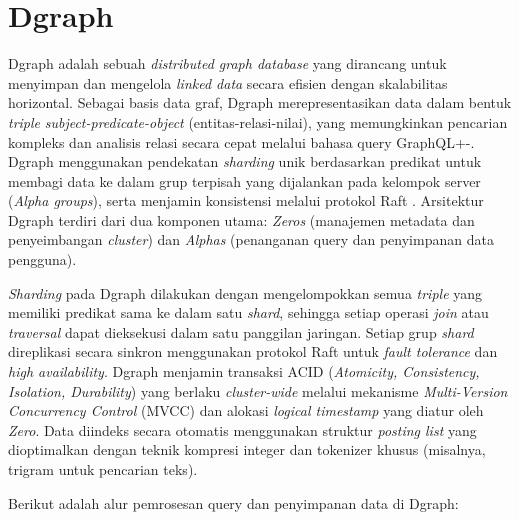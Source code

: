 \section{Dgraph}
\label{sec:dgraph}

Dgraph adalah sebuah \textit{distributed graph database} yang dirancang untuk menyimpan dan mengelola \textit{linked data} secara efisien dengan skalabilitas horizontal. Sebagai basis data graf, Dgraph merepresentasikan data dalam bentuk \textit{triple} \textit{subject-predicate-object} (entitas-relasi-nilai), yang memungkinkan pencarian kompleks dan analisis relasi secara cepat melalui bahasa query GraphQL+-. Dgraph menggunakan pendekatan \textit{sharding} unik berdasarkan predikat untuk membagi data ke dalam grup terpisah yang dijalankan pada kelompok server (\textit{Alpha groups}), serta menjamin konsistensi melalui protokol Raft \parencite{jain2005dgraph}. Arsitektur Dgraph terdiri dari dua komponen utama: \textit{Zeros} (manajemen metadata dan penyeimbangan \textit{cluster}) dan \textit{Alphas} (penanganan query dan penyimpanan data pengguna). 

\textit{Sharding} pada Dgraph dilakukan dengan mengelompokkan semua \textit{triple} yang memiliki predikat sama ke dalam satu \textit{shard}, sehingga setiap operasi \textit{join} atau \textit{traversal} dapat dieksekusi dalam satu panggilan jaringan. Setiap grup \textit{shard} direplikasi secara sinkron menggunakan protokol Raft untuk \textit{fault tolerance} dan \textit{high availability}. Dgraph menjamin transaksi ACID (\textit{Atomicity, Consistency, Isolation, Durability}) yang berlaku \textit{cluster-wide} melalui mekanisme \textit{Multi-Version Concurrency Control} (MVCC) dan alokasi \textit{logical timestamp} yang diatur oleh \textit{Zero}. Data diindeks secara otomatis menggunakan struktur \textit{posting list} yang dioptimalkan dengan teknik kompresi integer dan tokenizer khusus (misalnya, trigram untuk pencarian teks).

Berikut adalah alur pemrosesan query dan penyimpanan data di Dgraph:

